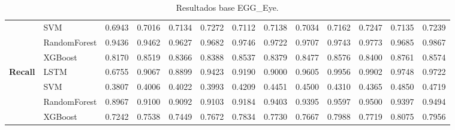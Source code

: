 \begin{table}[h]
\begin{adjustbox}{max width=15cm}
\begin{tabular}{|c|l|r|r|r|r|r|r|r|r|r|r|r|}
			& SVM &  0.6943 &  0.7016 &  0.7134 &  0.7272 &  0.7112 &  0.7138 &  0.7034 &  0.7162 &  0.7247 &  0.7135 &  0.7239 \\
			& RandomForest &  0.9436 &  0.9462 &  0.9627 &  0.9682 &  0.9746 &  0.9722 &  0.9707 &  0.9743 &  0.9773 &  0.9685 &  0.9867 \\
			& XGBoost &  0.8170 &  0.8519 &  0.8366 &  0.8388 &  0.8537 &  0.8379 &  0.8477 &  0.8576 &  0.8400 &  0.8761 &  0.8574 \\
			\hline
			\textbf{Recall} & LSTM &  0.6755 &  0.9067 &  0.8899 &  0.9423 &  0.9190 &  0.9000 &  0.9605 &  0.9956 &  0.9902 &  0.9748 &  0.9722 \\
			& SVM &  0.3807 &  0.4006 &  0.4022 &  0.3993 &  0.4209 &  0.4451 &  0.4500 &  0.4310 &  0.4365 &  0.4850 &  0.4719 \\
			& RandomForest &  0.8967 &  0.9100 &  0.9092 &  0.9103 &  0.9184 &  0.9403 &  0.9395 &  0.9597 &  0.9500 &  0.9397 &  0.9494 \\
			& XGBoost &  0.7242 &  0.7538 &  0.7449 &  0.7672 &  0.7834 &  0.7730 &  0.7667 &  0.7988 &  0.7719 &  0.8075 &  0.7956 \\
			\hline
		\end{tabular}
	\end{adjustbox}
	\caption{Resultados base EGG\_Eye.}
	\label{tab:EGGEyebase}
\end{table}
